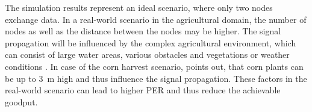 The simulation results represent an ideal scenario, where only two nodes exchange data.
In a real-world scenario in the agricultural domain, the number of nodes as well as the distance between the nodes may be higher.
The signal propagation will be influenced by the complex agricultural environment,
which can consist of large water areas, various obstacles and vegetations or weather conditions \cite{brinkhoff_characterization_2017}.
In case of the corn harvest scenario, \textcite{smolnik_5g_2020} points out, that corn plants can be up to \SI{3}{\metre} high
and thus influence the signal propagation.
These factors in the real-world scenario can lead to higher \ac{PER} and thus reduce the achievable goodput.

